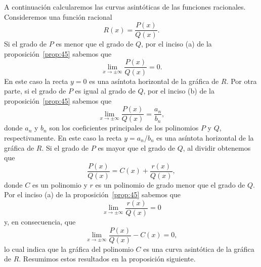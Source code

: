 \documentclass[12pt,a4paper]{book}
\begin{document}
    A continuación calcularemos las curvas asintóticas de las funciones racionales.
    Consideremos una función racional
    \begin{equation*}
        R(x)=\frac{P(x)}{Q(x)}.
    \end{equation*}
    Si el grado de $P$ es menor que el grado de $Q$, por el inciso (a) de la proposición~\ref{prop:45}
    sabemos que
    \begin{equation*}
        \lim_{x\to\pm\infty}\frac{P(x)}{Q(x)}=0.
    \end{equation*}
    En este caso la recta $y=0$ es una asíntota horizontal de la gráfica de $R$. Por
    otra parte, si el grado de $P$ es igual al grado de $Q$, por el inciso (b) de la
    proposición~\ref{prop:45} sabemos que
    \begin{equation*}
        \lim_{x\to\pm\infty}\frac{P(x)}{Q(x)}=\frac{a_{n}}{b_{n}},
    \end{equation*}
    donde $a_{n}$ y $b_{n}$ son los coeficientes principales de los polinomios $P$ y $Q$,
    respectivamente. En este caso la recta $y=a_{n}/b_{n}$ es una asíntota horizontal
    de la gráfica de $R$. Si el grado de $P$ es mayor que el grado de $Q$, al dividir
    obtenemos que
    \begin{equation*}
        \frac{P(x)}{Q(x)}=C(x)+\frac{r(x)}{Q(x)},
    \end{equation*}
    donde $C$ es un polinomio y $r$ es un polinomio de grado menor que el grado
    de $Q$. Por el inciso (a) de la proposición~\ref{prop:45} sabemos que
    \begin{equation*}
        \lim_{x\to\pm\infty}\frac{r(x)}{Q(x)}=0
    \end{equation*}
    y, en consecuencia, que
    \begin{equation*}
        \lim_{x\to\pm\infty}\frac{P(x)}{Q(x)}-C(x)=0,
    \end{equation*}
    lo cual indica que la gráfica del polinomio $C$ es una curva asintótica de la
    gráfica de $R$. Resumimos estos resultados en la proposición siguiente.
\end{document}
